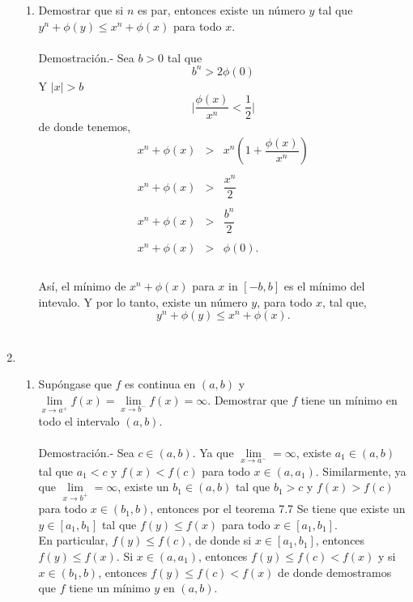 \begin{enumerate}
\begin{enumerate}[\bfseries (a)]
	\item Demostrar que si $n$ es par, entonces existe un número $y$ tal que $y^n+\phi(y)\leq x^n + \phi(x)$ para todo $x$.\\\\
	    Demostración.-\; Sea $b>0$ tal que 
	    $$b^n>2\phi(0)$$
	    Y $|x|>b$ 
	    $$\bigg|\dfrac{\phi(x)}{x^n}<\dfrac{1}{2}\bigg|$$
	    de donde tenemos,
	    $$\begin{array}{rcl}
		x^n+\phi(x)&>&x^n\left(1+\dfrac{\phi(x)}{x^n}\right)\\\\
		x^n+\phi(x)&>&\dfrac{x^n}{2}\\\\
		x^n+\phi(x)&>&\dfrac{b^n}{2}\\\\
		x^n+\phi(x)&>&\phi(0).\\\\
	    \end{array}$$

	    Así, el mínimo de $x^n+\phi(x)$ para $x$ in $[-b,b]$ es el mínimo del intevalo.
	    Y por lo tanto, existe un número $y$, para todo $x$, tal que,
	    $$y^n+\phi(y)\leq x^n +\phi(x).$$\\

    \end{enumerate}

\item 
    \begin{enumerate}[\bfseries (a)]

	\item Supóngase que $f$ es continua en $(a,b)$ y $\lim\limits_{x\to a^+} f(x)=\lim\limits_{x\to b^-} f(x)=\infty$. Demostrar que $f$ tiene un mínimo en todo el intervalo $(a,b)$.\\\\
	    Demostración.-\; Sea $c\in (a,b)$. Ya que $\lim\limits_{x\to a^-}=\infty$, existe $a_1\in (a,b)$ tal que $a_1<c$ y $f(x)<f(c)$ para todo $x\in (a,a_1)$. Similarmente, ya que $\lim\limits_{x\to b^+}=\infty$, existe un $b_1\in (a,b)$ tal que $b_1>c$ y $f(x)>f(c)$ para todo $x\in (b_1,b)$, entonces por el teorema 7.7  Se tiene que existe un $y\in [a_1,b_1]$ tal que $f(y)\leq f(x)$ para todo $x\in [a_1,b_1]$.\\
	    En particular, $f(y)\leq f(c)$, de donde si $x\in[a_1,b_1]$, entonces $f(y)\leq f(x)$. Si $x\in(a,a_1)$, entonces $f(y)\leq f(c)<f(x)$ y si $x\in (b_1,b)$, entonces $f(y)\leq f(c)<f(x)$ de donde demostramos que $f$ tiene un mínimo $y$  en $(a,b)$.\\\\


\end{enumerate}
\end{enumerate}
